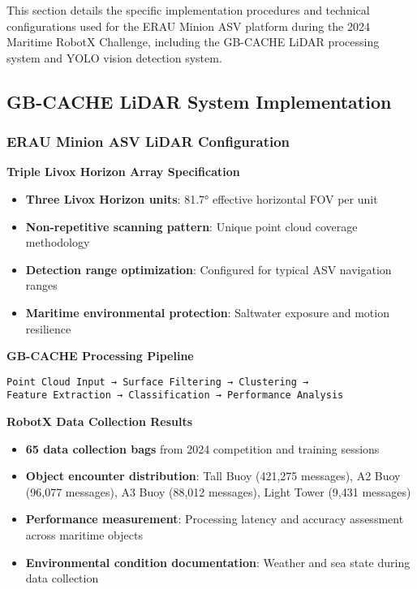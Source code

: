 \documentclass{erauthesis}
\begin{document}
This section details the specific implementation procedures and technical configurations used for the ERAU Minion ASV platform during the 2024 Maritime RobotX Challenge, including the GB-CACHE LiDAR processing system and YOLO vision detection system.

\subsection{GB-CACHE LiDAR System Implementation}

\subsubsection{ERAU Minion ASV LiDAR Configuration}

\textbf{Triple Livox Horizon Array Specification}
\begin{itemize}
\item \textbf{Three Livox Horizon units}: 81.7° effective horizontal FOV per unit
\item \textbf{Non-repetitive scanning pattern}: Unique point cloud coverage methodology
\item \textbf{Detection range optimization}: Configured for typical ASV navigation ranges
\item \textbf{Maritime environmental protection}: Saltwater exposure and motion resilience
\end{itemize}

\textbf{GB-CACHE Processing Pipeline}
\begin{verbatim}
Point Cloud Input → Surface Filtering → Clustering →
Feature Extraction → Classification → Performance Analysis
\end{verbatim}

\textbf{RobotX Data Collection Results}
\begin{itemize}
\item \textbf{65 data collection bags} from 2024 competition and training sessions
\item \textbf{Object encounter distribution}: Tall Buoy (421,275 messages), A2 Buoy (96,077 messages), A3 Buoy (88,012 messages), Light Tower (9,431 messages)
\item \textbf{Performance measurement}: Processing latency and accuracy assessment across maritime objects
\item \textbf{Environmental condition documentation}: Weather and sea state during data collection
\end{itemize}
\end{document}
